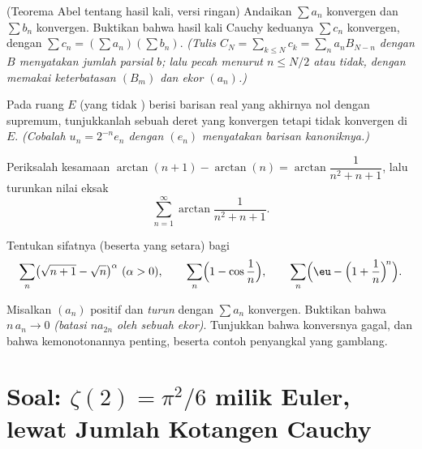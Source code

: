 \begin{exercise}[$\star\star\star$]\label{exo:b2:series:8}
(Teorema Abel tentang hasil kali, versi ringan) Andaikan $\sum a_n$
konvergen  dan $\sum b_n$ konvergen. Buktikan bahwa hasil kali
Cauchy keduanya $\sum c_n$ konvergen, dengan $\sum c_n = (\sum
a_n)(\sum b_n)$. \emph{(Tulis $C_N = \sum_{k\leq N} c_k = \sum_n
a_n B_{N-n}$ dengan $B$ menyatakan jumlah parsial $b$; lalu pecah menurut
$n \leq N/2$ atau tidak, dengan memakai keterbatasan $(B_m)$ dan ekor
 $(a_n)$.)}
\end{exercise}

\begin{exercise}[$\star\star\star$]\label{exo:b2:series:9}
Pada ruang $E$ (yang tidak ) berisi barisan real yang akhirnya
nol dengan  supremum, tunjukkanlah sebuah deret yang konvergen
 tetapi tidak konvergen di $E$. \emph{(Cobalah $u_n = 2^{-n} e_n$
dengan $(e_n)$ menyatakan barisan kanoniknya.)}
\end{exercise}

\begin{exercise}[$\star\star$]\label{exo:b2:series:10}
Periksalah kesamaan $\arctan(n+1) - \arctan(n) =
\arctan\dfrac{1}{n^2 + n + 1}$, lalu turunkan nilai eksak
\[
\sum_{n=1}^{\infty} \arctan\frac{1}{n^2 + n + 1} .
\]
\end{exercise}

\begin{exercise}[$\star\star$]\label{exo:b2:series:11}
Tentukan sifatnya (beserta yang setara) bagi
\[
\sum_n \bigl(\sqrt{n+1} - \sqrt n\bigr)^{\alpha}
\ (\alpha > 0), \qquad
\sum_n \Bigl(1 - \cos\frac1n\Bigr), \qquad
\sum_n \Bigl(\eu - \Bigl(1 + \frac1n\Bigr)^{\!n}\Bigr).
\]
\end{exercise}

\begin{exercise}[$\star\star\star$]\label{exo:b2:series:12}
Misalkan $(a_n)$ positif dan \emph{turun} dengan $\sum a_n$
konvergen. Buktikan bahwa $n\,a_n \to 0$ \emph{(batasi $n a_{2n}$ oleh
sebuah ekor)}. Tunjukkan bahwa konversnya gagal, dan bahwa
kemonotonannya penting, beserta contoh penyangkal yang gamblang.
\end{exercise}

\section{Soal: $\zeta(2) = \pi^2/6$ milik Euler, lewat Jumlah
Kotangen Cauchy}

